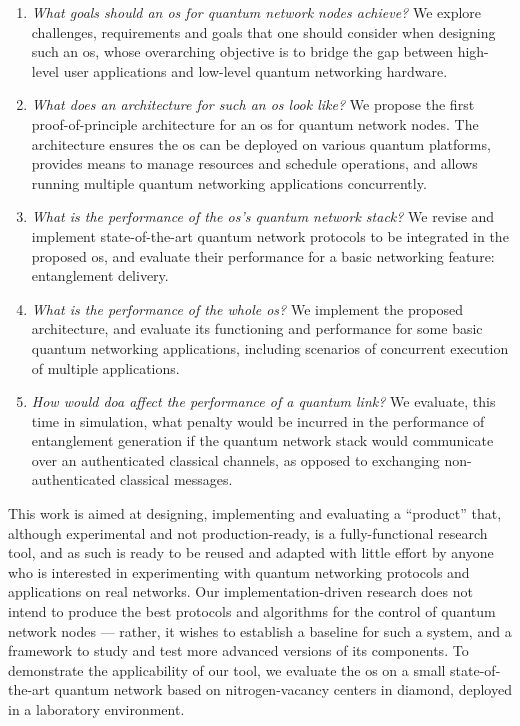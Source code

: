 \begin{enumerate}[label={Q\arabic*.}]
    \item \emph{What goals should an \acrshort{os} for quantum network nodes achieve?} We explore
          challenges, requirements and goals that one should consider when designing such an
          \acrshort{os}, whose overarching objective is to bridge the gap between high-level user
          applications and low-level quantum networking hardware.
    \item \emph{What does an architecture for such an \acrshort{os} look like?} We propose the first
          proof-of-principle architecture for an \acrshort{os} for quantum network nodes. The
          architecture ensures the \acrshort{os} can be deployed on various quantum platforms,
          provides means to manage resources and schedule operations, and allows running multiple
          quantum networking applications concurrently.
    \item \emph{What is the performance of the \acrshort{os}'s quantum network stack?} We revise and
          implement state-of-the-art quantum network protocols to be integrated in the proposed
          \acrshort{os}, and evaluate their performance for a basic networking feature: entanglement
          delivery.
    \item \emph{What is the performance of the whole \acrshort{os}?} We implement the proposed
          architecture, and evaluate its functioning and performance for some basic quantum
          networking applications, including scenarios of concurrent execution of multiple
          applications.
    \item \emph{How would \acrlong{doa} affect the performance of a quantum link?} We evaluate, this
          time in simulation, what penalty would be incurred in the performance of entanglement
          generation if the quantum network stack would communicate over an authenticated classical
          channels, as opposed to exchanging non-authenticated classical messages.
\end{enumerate}

This work is aimed at designing, implementing and evaluating a ``product'' that, although
experimental and not production-ready, is a fully-functional research tool, and as such is ready to
be reused and adapted with little effort by anyone who is interested in experimenting with quantum
networking protocols and applications on real networks. Our implementation-driven research does not
intend to produce the best protocols and algorithms for the control of quantum network nodes ---
rather, it wishes to establish a baseline for such a system, and a framework to study and test more
advanced versions of its components. To demonstrate the applicability of our tool, we evaluate the
\acrshort{os} on a small state-of-the-art quantum network based on nitrogen-vacancy centers in
diamond, deployed in a laboratory environment.

